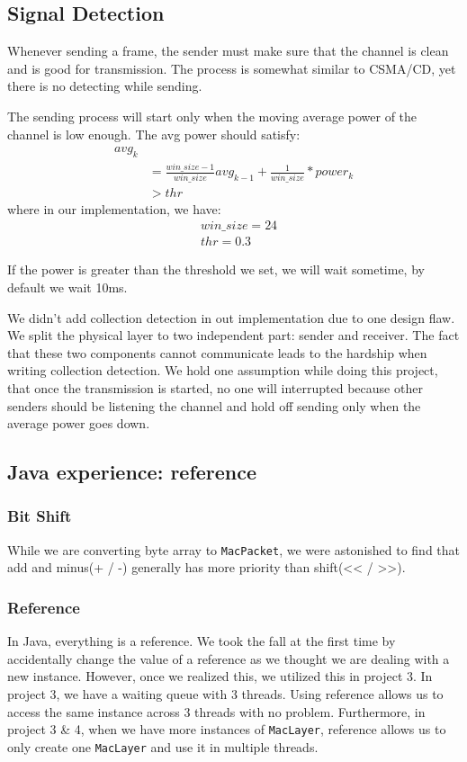 \documentclass[conference,compsoc]{IEEEtran}
\begin{document}
	\subsection{Signal Detection}
		Whenever sending a frame, the sender must make sure that the channel is clean and is good for transmission.
		The process is somewhat similar to CSMA/CD, yet there is no detecting while sending.
		\par
		The sending process will start only when the moving average power of the channel is low enough. The avg power should satisfy:
		\begin{equation}\begin{aligned}
		avg_k \\
		& = 
			\frac{win\_size-1}{win\_size}avg_{k-1} + 
			\frac{1}{win\_size} * power_k \\
		& > thr
		\end{aligned}\end{equation}
		where in our implementation, we have:
		\begin{equation*}\begin{aligned} 
			& win\_size = 24 \\
			& thr = 0.3 
		\end{aligned}\end{equation*}
		\par
		If the power is	greater than the threshold we set, we will wait sometime, by default we wait 10ms.
		\par 
		We didn't add collection detection in out implementation due to one design flaw. We split the physical layer to two independent part: sender and receiver. The fact that these two components cannot communicate leads to the hardship when writing collection detection. We hold one assumption while doing this project, that once the transmission is started, no one will interrupted because other senders should be listening the channel and hold off sending only when the average power goes down.
	\subsection{Java experience: reference}
		\subsubsection{Bit Shift} While we are converting byte array to \lstinline{MacPacket}, we were astonished to find that add and minus(+ / -) generally has more priority than shift(<< / >>).
		\subsubsection{Reference} In Java, everything is a reference. 
		We took the fall at the first time by accidentally change the value of a reference as we thought we are dealing with a new instance. 
		However, once we realized this, we utilized this in project 3. 
		In project 3, we have a waiting queue with 3 threads.
		Using reference allows us to access the same instance across 3 threads with no problem.
		Furthermore, in project 3 \& 4, when we have more instances of \lstinline{MacLayer}, reference allows us to only create one \lstinline{MacLayer} and use it in multiple threads.
\end{document}
